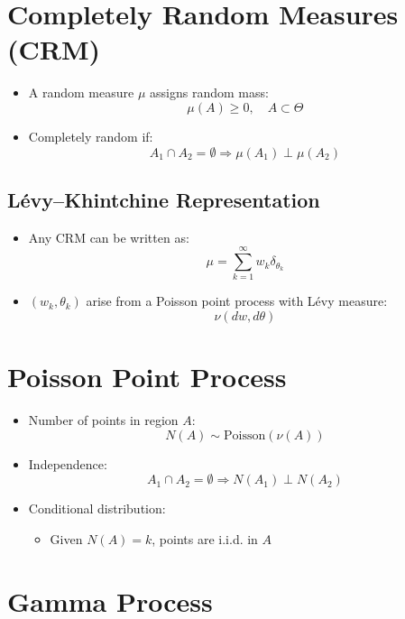 \documentclass[12pt,oneside]{book}
\numberwithin{equation}{section}
\theoremstyle{definition}
\theoremstyle{plain}
\theoremstyle{remark}
\begin{document}
\section{Completely Random Measures (CRM)}

\begin{itemize}
\item A random measure $\mu$ assigns random mass:
\[
\mu(A) \ge 0, \quad A \subset \Theta
\]

\item Completely random if:
\[
A_1 \cap A_2 = \emptyset \Rightarrow \mu(A_1) \perp \mu(A_2)
\]
\end{itemize}

\subsection{Lévy--Khintchine Representation}

\begin{itemize}
\item Any CRM can be written as:
\[
\mu = \sum_{k=1}^\infty w_k \delta_{\theta_k}
\]

\item $(w_k, \theta_k)$ arise from a Poisson point process with Lévy measure:
\[
\nu(dw, d\theta)
\]
\end{itemize}

\section{Poisson Point Process}

\begin{itemize}
\item Number of points in region $A$:
\[
N(A) \sim \text{Poisson}(\nu(A))
\]

\item Independence:
\[
A_1 \cap A_2 = \emptyset \Rightarrow N(A_1) \perp N(A_2)
\]

\item Conditional distribution:
\begin{itemize}
\item Given $N(A)=k$, points are i.i.d. in $A$
\end{itemize}
\end{itemize}

\section{Gamma Process}
\end{document}
